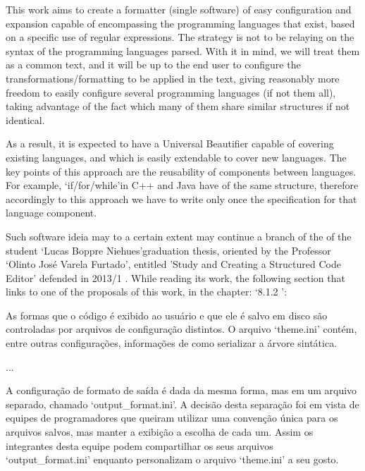\begin{englishtext}

    This work aims to create a formatter (single software) of easy configuration
    and expansion capable of encompassing the programming languages that exist,
    based on a specific use of regular expressions. The strategy is not to be
    relaying on the syntax of the programming languages parsed. With it in mind,
    we will treat them as a common text, and it will be up to the end user to
    configure the transformations/formatting to be applied in the text, giving
    reasonably more freedom to easily configure several programming languages
    (if not them all), taking advantage of the fact which many of them share
    similar structures if not identical.

    As a result, it is expected to have a Universal Beautifier capable of
    covering existing languages, and which is easily extendable to cover new
    languages. The key points of this approach are the reusability of components
    between languages. For example, `if/for/while'\s in C++ and Java have of the
    same structure, therefore accordingly to this approach we have to write only
    once the specification for that language component.

    Such software ideia may to a certain extent may continue a branch of the of
    the student `Lucas Boppre Niehues'\s graduation thesis, oriented by the
    Professor `Olinto José Varela Furtado', entitled 'Study and Creating a
    Structured Code Editor' defended in 2013/1 \cite{structuredEditorStudy}.
    While reading its work, the following section that links to one of the
    proposals of this work, in the chapter: `8.1.2 ':

    \medskip
    \begin{citacao}
    As formas que o código é exibido ao usuário e que ele é salvo em disco são controladas
    por arquivos de configuração distintos. O arquivo `theme.ini' contém, entre outras
    configurações, informações de como serializar a árvore sintática.
    \end{citacao}

    \vspace{-5mm}
    ...
    \begin{citacao}
    A configuração de formato de saída é dada da mesma forma, mas em um arquivo
    separado, chamado `output\_format.ini'. A decisão desta separação foi em vista de equipes
    de programadores que queiram utilizar uma convenção única para os arquivos salvos,
    mas manter a exibição a escolha de cada um. Assim os integrantes desta equipe podem
    compartilhar os seus arquivos `output\_format.ini' enquanto personalizam o arquivo
    `theme.ini' a seu gosto.
    \end{citacao}


\end{englishtext}
